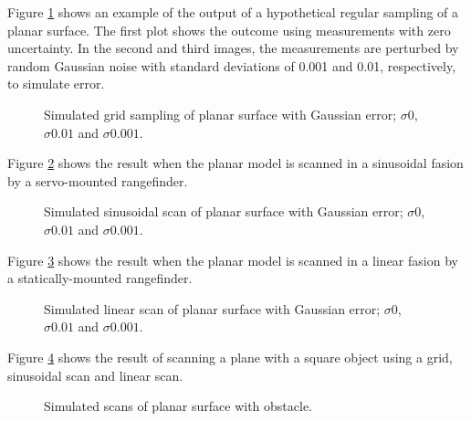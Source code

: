 \documentclass[10pt,a4paper]{report}
\begin{document}
Figure \ref{fig:point_plane} shows an example of the output of a hypothetical regular sampling of a planar surface. The first plot shows the outcome using measurements with zero uncertainty. In the second and third images, the measurements are perturbed by random Gaussian noise with standard deviations of 0.001 and 0.01, respectively, to simulate error.

\begin{figure}
\centering
\def\svgscale{0.25}

\def\svgscale{0.25}

\def\svgscale{0.25}

\caption{Simulated grid sampling of planar surface with Gaussian error; $\sigma 0$, $\sigma 0.01$ and $\sigma 0.001$.}
\label{fig:point_plane}
\end{figure}


Figure \ref{fig:sinus_plane} shows the result when the planar model is scanned in a sinusoidal fasion by a servo-mounted rangefinder.

\begin{figure}
\centering
\def\svgscale{0.25}

\def\svgscale{0.25}

\def\svgscale{0.25}

\caption{Simulated sinusoidal scan of planar surface with Gaussian error; $\sigma 0$, $\sigma 0.01$ and $\sigma 0.001$.}
\label{fig:sinus_plane}
\end{figure}


Figure \ref{fig:linear_plane} shows the result when the planar model is scanned in a linear fasion by a statically-mounted rangefinder.

\begin{figure}
\centering
\def\svgscale{0.25}

\def\svgscale{0.25}

\def\svgscale{0.25}

\caption{Simulated linear scan of planar surface with Gaussian error; $\sigma 0$, $\sigma 0.01$ and $\sigma 0.001$.}
\label{fig:linear_plane}
\end{figure}

Figure \ref{fig:plane_object} shows the result of scanning a plane with a square object using a grid, sinusoidal scan and linear scan.

\begin{figure}
\centering
\def\svgscale{0.25}

\def\svgscale{0.25}

\def\svgscale{0.25}

\caption{Simulated scans of planar surface with obstacle.}
\label{fig:plane_object}
\end{figure}
\end{document}
